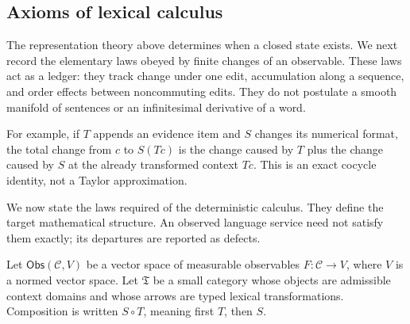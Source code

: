 \documentclass[11pt]{article}
\newcommand{\Ctxt}{\mathcal C}
\newcommand{\Trans}{\mathfrak T}
\begin{document}
\subsection{Axioms of lexical calculus}

The representation theory above determines when a closed state exists.  We
next record the elementary laws obeyed by finite changes of an observable.
These laws act as a ledger: they track change under one edit, accumulation
along a sequence, and order effects between noncommuting edits.  They do not
postulate a smooth manifold of sentences or an infinitesimal derivative of a
word.

For example, if $T$ appends an evidence item and $S$ changes its numerical
format, the total change from $c$ to $S(Tc)$ is the change caused by $T$ plus
the change caused by $S$ at the already transformed context $Tc$.  This is an
exact cocycle identity, not a Taylor approximation.

We now state the laws required of the deterministic calculus. They define the target mathematical structure. An observed language service need not satisfy them exactly; its departures are reported as defects.

Let $\mathsf{Obs}(\Ctxt,V)$ be a vector space of measurable observables $F:\Ctxt\to V$, where $V$ is a normed vector space. Let $\Trans$ be a small category whose objects are admissible context domains and whose arrows are typed lexical transformations. Composition is written $S\circ T$, meaning first $T$, then $S$.
\end{document}
